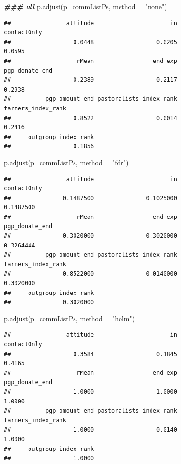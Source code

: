 \documentclass[
]{article}
\newenvironment{Shaded}{\begin{snugshade}}{\end{snugshade}}
\newcommand{\AttributeTok}[1]{\textcolor[rgb]{0.77,0.63,0.00}{#1}}
\newcommand{\DocumentationTok}[1]{\textcolor[rgb]{0.56,0.35,0.01}{\textbf{\textit{#1}}}}
\newcommand{\FunctionTok}[1]{\textcolor[rgb]{0.00,0.00,0.00}{#1}}
\newcommand{\NormalTok}[1]{#1}
\newcommand{\StringTok}[1]{\textcolor[rgb]{0.31,0.60,0.02}{#1}}
\begin{document}
\begin{Shaded}
\begin{Highlighting}[]
\DocumentationTok{\#\#\# all}
\FunctionTok{p.adjust}\NormalTok{(}\AttributeTok{p=}\NormalTok{commListPs, }\AttributeTok{method =} \StringTok{"none"}\NormalTok{)}
\end{Highlighting}
\end{Shaded}

\begin{verbatim}
##                attitude                      in             contactOnly 
##                  0.0448                  0.0205                  0.0595 
##                   rMean                 end_exp          pgp_donate_end 
##                  0.2389                  0.2117                  0.2938 
##          pgp_amount_end pastoralists_index_rank      farmers_index_rank 
##                  0.8522                  0.0014                  0.2416 
##     outgroup_index_rank 
##                  0.1856
\end{verbatim}

\begin{Shaded}
\begin{Highlighting}[]
\FunctionTok{p.adjust}\NormalTok{(}\AttributeTok{p=}\NormalTok{commListPs, }\AttributeTok{method =} \StringTok{"fdr"}\NormalTok{)}
\end{Highlighting}
\end{Shaded}

\begin{verbatim}
##                attitude                      in             contactOnly 
##               0.1487500               0.1025000               0.1487500 
##                   rMean                 end_exp          pgp_donate_end 
##               0.3020000               0.3020000               0.3264444 
##          pgp_amount_end pastoralists_index_rank      farmers_index_rank 
##               0.8522000               0.0140000               0.3020000 
##     outgroup_index_rank 
##               0.3020000
\end{verbatim}

\begin{Shaded}
\begin{Highlighting}[]
\FunctionTok{p.adjust}\NormalTok{(}\AttributeTok{p=}\NormalTok{commListPs, }\AttributeTok{method =} \StringTok{"holm"}\NormalTok{)}
\end{Highlighting}
\end{Shaded}

\begin{verbatim}
##                attitude                      in             contactOnly 
##                  0.3584                  0.1845                  0.4165 
##                   rMean                 end_exp          pgp_donate_end 
##                  1.0000                  1.0000                  1.0000 
##          pgp_amount_end pastoralists_index_rank      farmers_index_rank 
##                  1.0000                  0.0140                  1.0000 
##     outgroup_index_rank 
##                  1.0000
\end{verbatim}
\end{document}
